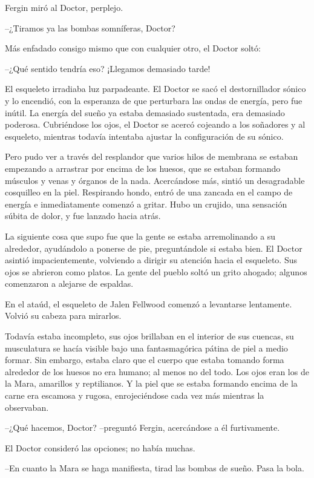 Fergin miró al Doctor, perplejo.

--¿Tiramos ya las bombas somníferas, Doctor?

Más enfadado consigo mismo que con cualquier otro, el Doctor soltó:

--¿Qué sentido tendría eso? ¡Llegamos demasiado tarde!

El esqueleto irradiaba luz parpadeante. El Doctor se sacó el destornillador sónico y lo encendió, con la esperanza de que perturbara las ondas de energía, pero fue inútil. La energía del sueño ya estaba demasiado sustentada, era demasiado poderosa. Cubriéndose los ojos, el Doctor se acercó cojeando a los soñadores y al esqueleto, mientras todavía intentaba ajustar la configuración de su sónico.

Pero pudo ver a través del resplandor que varios hilos de membrana se estaban empezando a arrastrar por encima de los huesos, que se estaban formando músculos y venas y órganos de la nada. Acercándose más, sintió un desagradable cosquilleo en la piel. Respirando hondo, entró de una zancada en el campo de energía e inmediatamente comenzó a gritar. Hubo un crujido, una sensación súbita de dolor, y fue lanzado hacia atrás.

La siguiente cosa que supo fue que la gente se estaba arremolinando a su alrededor, ayudándolo a ponerse de pie, preguntándole si estaba bien. El Doctor asintió impacientemente, volviendo a dirigir su atención hacia el esqueleto. Sus ojos se abrieron como platos. La gente del pueblo soltó un grito ahogado; algunos comenzaron a alejarse de espaldas.

En el ataúd, el esqueleto de Jalen Fellwood comenzó a levantarse lentamente. Volvió su cabeza para mirarlos.

Todavía estaba incompleto, sus ojos brillaban en el interior de sus cuencas, su musculatura se hacía visible bajo una fantasmagórica pátina de piel a medio formar. Sin embargo, estaba claro que el cuerpo que estaba tomando forma alrededor de los huesos no era humano; al menos no del todo. Los ojos eran los de la Mara, amarillos y reptilianos. Y la piel que se estaba formando encima de la carne era escamosa y rugosa, enrojeciéndose cada vez más mientras la observaban.

--¿Qué hacemos, Doctor? --preguntó Fergin, acercándose a él furtivamente.

El Doctor consideró las opciones; no había muchas.

--En cuanto la Mara se haga manifiesta, tirad las bombas de sueño. Pasa la bola.

